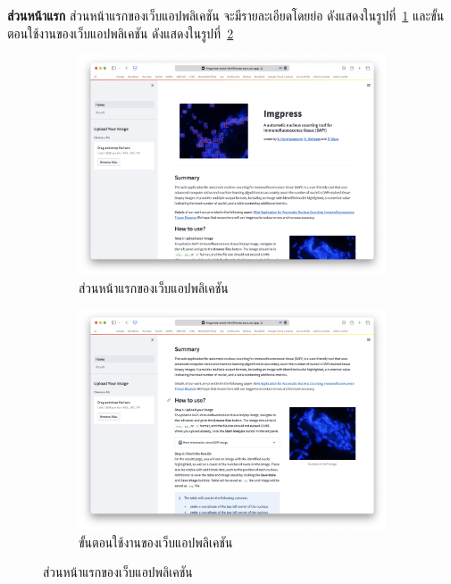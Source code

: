 \documentclass[12pt,oneside,openright,a4paper]{cpe-thai-project}
\begin{document}
\textbf{ส่วนหน้าแรก}
ส่วนหน้าแรกของเว็บแอปพลิเคชัน จะมีรายละเอียดโดยย่อ ดังแสดงในรูปที่~\ref{fig:web_home1} และขั้นตอนใช้งานของเว็บแอปพลิเคชัน ดังแสดงในรูปที่~\ref{fig:web_home2}
\begin{figure}[!h]
\centering
    \begin{subfigure}[b]{0.42\textwidth}
      \centering
        \includegraphics[width=\textwidth]{images/homepage.png}
        \caption{ส่วนหน้าแรกของเว็บแอปพลิเคชัน}\label{fig:web_home1}
    \end{subfigure}
    \begin{subfigure}[b]{0.42\textwidth}
        \centering
        \includegraphics[width=\textwidth]{images/usage.png}
        \caption{ขั้นตอนใช้งานของเว็บแอปพลิเคชัน}\label{fig:web_home2}
    \end{subfigure}
    \caption{ส่วนหน้าแรกของเว็บแอปพลิเคชัน}
    \label{fig:uploadweb}
\end{figure}
\pagebreak
\end{document}
